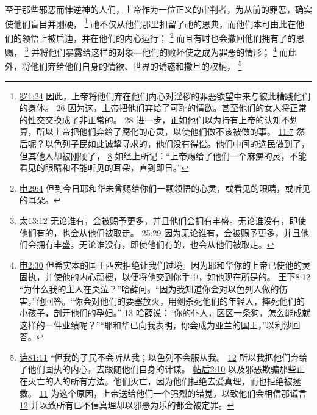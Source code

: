 \documentclass[12pt, a4paper, oneside]{ctexart}
\newcounter{parnum}[section]
\newcommand{\N}{%
   \noindent\refstepcounter{parnum}%
    \makebox[\parindent][l]{\textbf{\arabic{parnum}.}}}
\begin{document}
\N 至于那些邪恶而悖逆神的人们，上帝作为一位正义的审判者，为从前的罪恶，确实使他们盲目并刚硬，
	\footnote {
		\href{https://biblehub.com/romans/1-24.htm}{罗1:24} 因此，上帝将他们弃在他们内心对淫秽的罪恶欲望中来与彼此糟践他们的身体。
		\href{https://biblehub.com/romans/1-26.htm}{26} 因为这，上帝把他们弃给了可耻的情欲。甚至他们的女人将正常的性交交换成了非正常的。
		\href{https://biblehub.com/romans/1-28.htm}{28} 进一步，正如他们以为持有上帝的认知不划算，所以上帝把他们弃给了腐化的心灵，以使他们做不该被做的事。
		\href{https://biblehub.com/romans/11-7.htm}{11:7} 然后呢？以色列子民如此诚挚寻求的，他们没有得偿。他们中间的选民做到了，但其他人却被刚硬了，
		\href{https://biblehub.com/romans/11-8.htm}{8} 如经上所记：“上帝赐给了他们一个麻痹的灵，不能看见的眼睛和不能听见的耳朵，直到即日。”
	}
	祂不仅从他们那里扣留了祂的恩典，而他们本可由此在他们的领悟上被启迪，并在他们的内心运行；
	\footnote {
		\href{https://biblehub.com/deuteronomy/29-4.htm}{申29:4} 但到今日耶和华未曾赐给你们一颗领悟的心灵，或看见的眼睛，或听见的耳朵。
	}
	而且有时也会撤回他们拥有了的恩赐，
	\footnote {
		\href{https://biblehub.com/matthew/13-12.htm}{太13:12} 无论谁有，会被赐予更多，并且他们会拥有丰盛。无论谁没有，即使他们有的，也会从他们被取走。
		\href{https://biblehub.com/matthew/25-29.htm}{25:29} 因为无论谁有，会被赐予更多，并且他们会拥有丰盛。无论谁没有，即使他们有的，也会从他们被取走。
	}
	并将他们暴露给这样的对象---他们的败坏使之成为罪恶的情形；
	\footnote {
		\href{https://biblehub.com/deuteronomy/2-30.htm}{申2:30} 但希实本的国王西宏拒绝让我们过境。因为耶和华你的上帝已使他的灵固执，并使他的内心顽梗，以便将他交到你手中，如他现在所是的。
		\href{https://biblehub.com/2_kings/8-12.htm}{王下8:12} “为什么我的主人在哭泣？”哈薛问。“因为我知道你会对以色列人做的伤害，”他回答。“你会对他们的要塞放火，用剑杀死他们的年轻人，摔死他们的小孩子，剖开他们的孕妇。”
		\href{https://biblehub.com/2_kings/8-13.htm}{13} 哈薛说：“你的仆人，区区一条狗，怎么能成就这样的一件业绩呢？”“耶和华已向我表明，你会成为亚兰的国王，”以利沙回答。
	}
	而此外，将他们弃给他们自身的情欲、世界的诱惑和撒旦的权柄，
	\footnote {
		\href{https://biblehub.com/psalms/81-11.htm}{诗81:11} “但我的子民不会听从我；以色列不会服从我。
		\href{https://biblehub.com/psalms/81-12.htm}{12} 所以我把他们弃给了他们固执的内心，去跟随他们自身的计谋。
		\href{https://biblehub.com/2_thessalonians/2-10.htm}{帖后2:10} 以及邪恶欺骗那些正在灭亡的人的所有方法。他们灭亡，因为他们拒绝去爱真理，而也拒绝被拯救。
		\href{https://biblehub.com/2_thessalonians/2-11.htm}{11} 为这个原因，上帝送给他们一个强烈的错觉，以致他们会相信那谎言
		\href{https://biblehub.com/2_thessalonians/2-12.htm}{12} 并以致所有已不信真理却以邪恶为乐的都会被定罪。
	}
\end{document}
